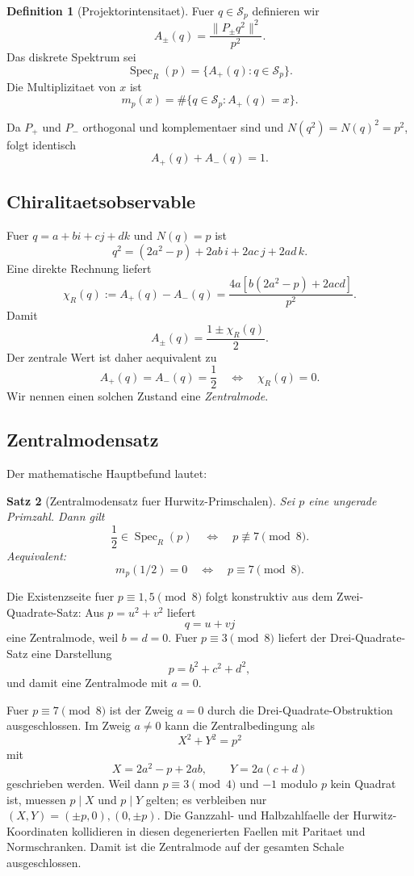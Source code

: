 \documentclass[11pt,a4paper]{article}
\newtheorem{satz}{Satz}[section]
\theoremstyle{definition}
\newtheorem{definition}[satz]{Definition}
\newcommand{\Spec}{\operatorname{Spec}}
\begin{document}
\begin{definition}[Projektorintensitaet]
Fuer $q\in\mathcal S_p$ definieren wir
\[
A_\pm(q)=\frac{\|P_\pm q^2\|^2}{p^2}.
\]
Das diskrete Spektrum sei
\[
\Spec_R(p)=\{A_+(q):q\in\mathcal S_p\}.
\]
Die Multiplizitaet von $x$ ist
\[
m_p(x)=\#\{q\in\mathcal S_p:A_+(q)=x\}.
\]
\end{definition}

Da $P_+$ und $P_-$ orthogonal und komplementaer sind und $N(q^2)=N(q)^2=p^2$, folgt identisch
\[
\boxed{A_+(q)+A_-(q)=1.}
\]

\subsection{Chiralitaetsobservable}
Fuer $q=a+bi+cj+dk$ und $N(q)=p$ ist
\[
q^2=(2a^2-p)+2ab\,i+2ac\,j+2ad\,k.
\]
Eine direkte Rechnung liefert
\[
\boxed{
\chi_R(q):=A_+(q)-A_-(q)
=\frac{4a\left[b(2a^2-p)+2acd\right]}{p^2}.}
\]
Damit
\[
A_\pm(q)=\frac{1\pm\chi_R(q)}2.
\]
Der zentrale Wert ist daher aequivalent zu
\[
A_+(q)=A_-(q)=\frac12
\quad\Longleftrightarrow\quad
\chi_R(q)=0.
\]
Wir nennen einen solchen Zustand eine \emph{Zentralmode}.

\subsection{Zentralmodensatz}
Der mathematische Hauptbefund lautet:

\begin{satz}[Zentralmodensatz fuer Hurwitz-Primschalen]\label{thm:center}
Sei $p$ eine ungerade Primzahl. Dann gilt
\[
\boxed{
\frac12\in\Spec_R(p)
\quad\Longleftrightarrow\quad
p\not\equiv7\pmod8.}
\]
Aequivalent:
\[
\boxed{m_p(1/2)=0\quad\Longleftrightarrow\quad p\equiv7\pmod8.}
\]
\end{satz}

Die Existenzseite fuer $p\equiv1,5\pmod8$ folgt konstruktiv aus dem Zwei-Quadrate-Satz: Aus $p=u^2+v^2$ liefert
\[
q=u+vj
\]
eine Zentralmode, weil $b=d=0$. Fuer $p\equiv3\pmod8$ liefert der Drei-Quadrate-Satz eine Darstellung
\[
p=b^2+c^2+d^2,
\]
und damit eine Zentralmode mit $a=0$.

Fuer $p\equiv7\pmod8$ ist der Zweig $a=0$ durch die Drei-Quadrate-Obstruktion ausgeschlossen. Im Zweig $a\neq0$ kann die Zentralbedingung als
\[
X^2+Y^2=p^2
\]
mit
\[
X=2a^2-p+2ab,
\qquad
Y=2a(c+d)
\]
geschrieben werden. Weil dann $p\equiv3\pmod4$ und $-1$ modulo $p$ kein Quadrat ist, muessen $p\mid X$ und $p\mid Y$ gelten; es verbleiben nur $(X,Y)=(\pm p,0),(0,\pm p)$. Die Ganzzahl- und Halbzahlfaelle der Hurwitz-Koordinaten kollidieren in diesen degenerierten Faellen mit Paritaet und Normschranken. Damit ist die Zentralmode auf der gesamten Schale ausgeschlossen.
\end{document}
